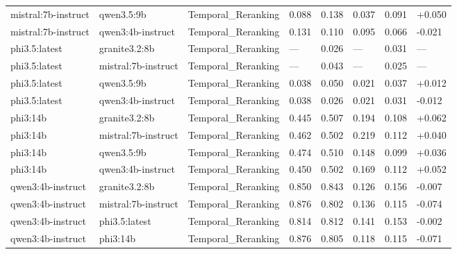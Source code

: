 \begin{table}
\begin{tabular}{llllllll}
mistral:7b-instruct & qwen3.5:9b & Temporal_Reranking & 0.088 & 0.138 & 0.037 & 0.091 & +0.050 \\
mistral:7b-instruct & qwen3:4b-instruct & Temporal_Reranking & 0.131 & 0.110 & 0.095 & 0.066 & -0.021 \\
phi3.5:latest & granite3.2:8b & Temporal_Reranking & --- & 0.026 & --- & 0.031 & --- \\
phi3.5:latest & mistral:7b-instruct & Temporal_Reranking & --- & 0.043 & --- & 0.025 & --- \\
phi3.5:latest & qwen3.5:9b & Temporal_Reranking & 0.038 & 0.050 & 0.021 & 0.037 & +0.012 \\
phi3.5:latest & qwen3:4b-instruct & Temporal_Reranking & 0.038 & 0.026 & 0.021 & 0.031 & -0.012 \\
phi3:14b & granite3.2:8b & Temporal_Reranking & 0.445 & 0.507 & 0.194 & 0.108 & +0.062 \\
phi3:14b & mistral:7b-instruct & Temporal_Reranking & 0.462 & 0.502 & 0.219 & 0.112 & +0.040 \\
phi3:14b & qwen3.5:9b & Temporal_Reranking & 0.474 & 0.510 & 0.148 & 0.099 & +0.036 \\
phi3:14b & qwen3:4b-instruct & Temporal_Reranking & 0.450 & 0.502 & 0.169 & 0.112 & +0.052 \\
qwen3:4b-instruct & granite3.2:8b & Temporal_Reranking & 0.850 & 0.843 & 0.126 & 0.156 & -0.007 \\
qwen3:4b-instruct & mistral:7b-instruct & Temporal_Reranking & 0.876 & 0.802 & 0.136 & 0.115 & -0.074 \\
qwen3:4b-instruct & phi3.5:latest & Temporal_Reranking & 0.814 & 0.812 & 0.141 & 0.153 & -0.002 \\
qwen3:4b-instruct & phi3:14b & Temporal_Reranking & 0.876 & 0.805 & 0.118 & 0.115 & -0.071 \\
\bottomrule
\end{tabular}
\end{table}

